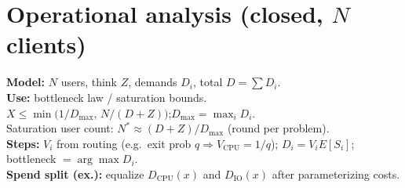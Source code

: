 \section*{Operational analysis (closed, $N$ clients)}
\textbf{Model:} $N$ users, think $Z$, demands $D_i$, total $D=\sum D_i$.\\
\textbf{Use:} bottleneck law / saturation bounds.\\
$X \le \min\bigl(1/D_{\max},\, N/(D+Z)\bigr)$;\quad $D_{\max}=\max_i D_i$.\\
Saturation user count: $N^\ast \approx (D+Z)/D_{\max}$ (round per problem).\\
\textbf{Steps:} $V_i$ from routing (e.g.\ exit prob $q\Rightarrow V_{\mathrm{CPU}}=1/q$); $D_i=V_i E[S_i]$; bottleneck $=\arg\max D_i$.\\
\textbf{Spend split (ex.):} equalize $D_{\mathrm{CPU}}(x)$ and $D_{\mathrm{IO}}(x)$ after parameterizing costs.
